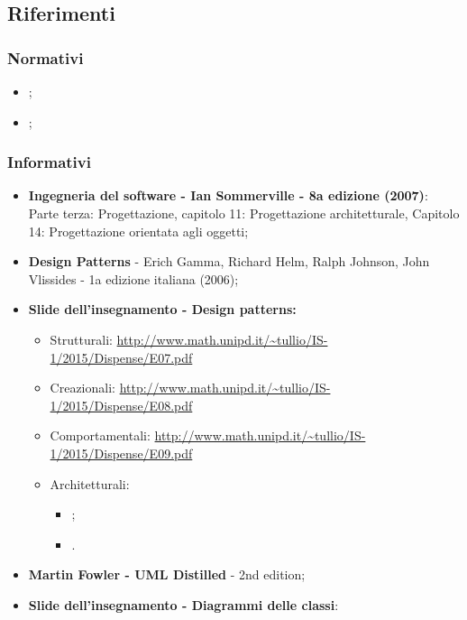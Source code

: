 \subsection{Riferimenti}
\subsubsection{Normativi}
\begin{itemize}
	\item \textit{\NdPv};
	\item \textit{\AdRvDue};
\end{itemize}
\subsubsection{Informativi}
\begin{itemize}
	\item \textbf{Ingegneria del software - Ian Sommerville - 8a edizione (2007)}: \\
	Parte terza: Progettazione, capitolo 11: Progettazione architetturale, Capitolo 14: Progettazione orientata agli oggetti;
	\item \textbf{Design Patterns} - Erich Gamma, Richard Helm, Ralph Johnson, John Vlissides - 1a edizione italiana (2006);
	\item \textbf{Slide dell'insegnamento - Design patterns:}
	\begin{itemize}
		\item Strutturali: \url{http://www.math.unipd.it/~tullio/IS-1/2015/Dispense/E07.pdf}
		\item Creazionali: \url{http://www.math.unipd.it/~tullio/IS-1/2015/Dispense/E08.pdf}
		\item Comportamentali: \url{http://www.math.unipd.it/~tullio/IS-1/2015/Dispense/E09.pdf}
		\item Architetturali:
		\begin{itemize}
			\item {};
			\item {}.
		\end{itemize} 
	\end{itemize}
	\item \textbf{Martin Fowler - UML Distilled} - 2nd edition;
	\item \textbf{Slide dell'insegnamento - Diagrammi delle classi}: \\

\end{itemize}
